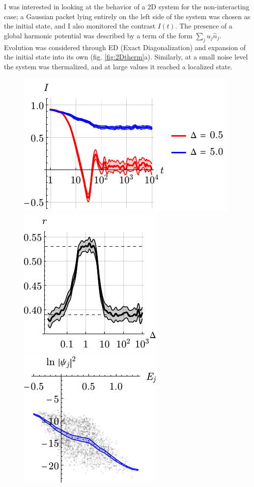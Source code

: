 

I was interested in looking at the behavior of a 2D system for the non-interacting case; a Gaussian packet lying entirely on the left side of the system was chosen as the initial state, and I also monitored the contrast $I(t)$. The presence of a global harmonic potential was described by a term of the form $\sum_j u_j \hat{n}_j$. Evolution was considered through ED (Exact Diagonalization) and expansion of the initial state into its own (fig. \ref{fig:2Dtherm}a). Similarly, at a small noise level the system was thermalized, and at large values it reached a localized state.

 
\begin{figure}[h]
    \centering
    \includegraphics{imgs/2Dth_loc.pdf}
    \includegraphics{imgs/2Drdel.pdf}
    \includegraphics{imgs/2Dtherm_1.pdf}

\end{figure}
